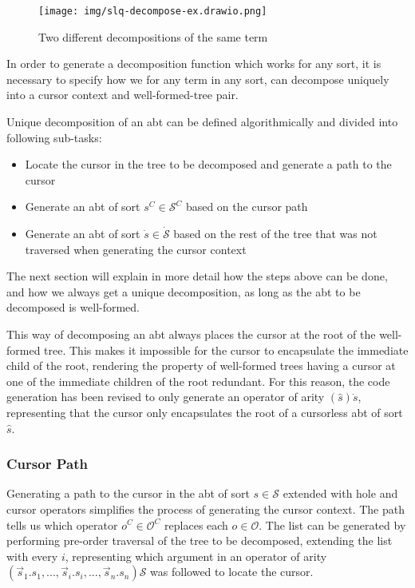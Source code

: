 \documentclass[sigplan]{acmart}
\newcommand{\abt}{\textsf{abt}\xspace}
\begin{document}
\begin{figure}%
  \centering
  \texttt{[image: img/slq-decompose-ex.drawio.png]}
  \caption{Two different decompositions of the same term}
  \label{fig:sql-decomp-ex}
\end{figure}

In order to generate a decomposition function which works for any sort,
it is necessary to specify how we for any term in any sort,
can decompose uniquely into a cursor context and well-formed-tree pair.

Unique decomposition of an \abt can be defined algorithmically and divided
into following sub-tasks:
\begin{itemize}
  \item Locate the cursor in the tree to be decomposed and generate a path to the cursor
  \item Generate an \abt of sort $s^C \in \mathcal{S}^C$ based on the cursor path
  \item Generate an \abt of sort $\dot{s} \in \dot{\mathcal{S}}$
        based on the rest of the tree that was not traversed
        when generating the cursor context
\end{itemize}

The next section will explain in more detail how the steps above can be done,
and how we always get a unique decomposition, as long as the \abt to be decomposed is well-formed.

This way of decomposing an \abt always places the cursor at the root of the
well-formed tree. This makes it impossible for the cursor to encapsulate the immediate
child of the root, rendering the property of well-formed trees having a cursor at one of the immediate children of the root redundant. For this reason, the code generation
has been revised to only generate an operator of arity $(\hat{s})\dot{s}$,
representing that the cursor only encapsulates the root of a cursorless \abt
of sort $\hat{s}$.

\subsubsection{Cursor Path}

Generating a path to the cursor in the \abt of sort $s \in \mathcal{S}$ extended with
hole and cursor operators simplifies the process of generating the cursor context. The path tells us
which operator $o^C \in \mathcal{O}^C$ replaces each $o \in \mathcal{O}$.
The list can be generated by performing pre-order traversal of the tree to be decomposed,
extending the list with every $i$, representing which argument in an operator of
arity $(\vec{s}_1.s_1, ... , \vec{s}_i.s_i, ..., \vec{s}_n.s_n)\mathcal{S}$ was
followed to locate the cursor.
\end{document}
